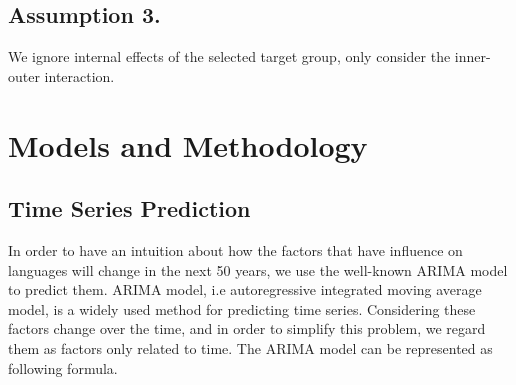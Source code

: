 \documentclass{mcmthesis}
\begin{document}
  \subsection{Assumption 3.}
  
    \indent \indent We ignore internal effects of the selected target group, only consider the inner-outer interaction.
   
  
  
  
  
  
  
  
  
  \section{Models and Methodology}
    \subsection{Time Series Prediction}
    \indent \indent In order to have an intuition about how the factors that have influence on languages will change in the next 50 years, we use the well-known ARIMA model to predict them. ARIMA model, i.e autoregressive integrated moving average model, is a widely used method for predicting time series. Considering these factors change over the time, and in order to simplify this problem, we regard them as factors only related to time. The ARIMA model can be represented as following formula.
  
\end{document}

